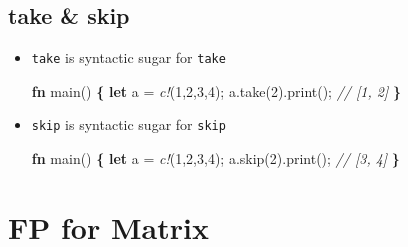 \documentclass[]{book}
\newenvironment{Shaded}{\begin{snugshade}}{\end{snugshade}}
\newcommand{\CommentTok}[1]{\textcolor[rgb]{0.56,0.35,0.01}{\textit{#1}}}
\newcommand{\DecValTok}[1]{\textcolor[rgb]{0.00,0.00,0.81}{#1}}
\newcommand{\KeywordTok}[1]{\textcolor[rgb]{0.13,0.29,0.53}{\textbf{#1}}}
\newcommand{\NormalTok}[1]{#1}
\newcommand{\OperatorTok}[1]{\textcolor[rgb]{0.81,0.36,0.00}{\textbf{#1}}}
\newcommand{\PreprocessorTok}[1]{\textcolor[rgb]{0.56,0.35,0.01}{\textit{#1}}}
\begin{document}
\hypertarget{take-skip}{%
\subsection{take \& skip}\label{take-skip}}

\begin{itemize}
\item
  \texttt{take} is syntactic sugar for \texttt{take}

\begin{Shaded}
\begin{Highlighting}[]
\KeywordTok{fn}\NormalTok{ main() }\OperatorTok{\{}
    \KeywordTok{let}\NormalTok{ a = }\PreprocessorTok{c!}\NormalTok{(}\DecValTok{1}\NormalTok{,}\DecValTok{2}\NormalTok{,}\DecValTok{3}\NormalTok{,}\DecValTok{4}\NormalTok{);}
\NormalTok{    a.take(}\DecValTok{2}\NormalTok{).print();}
    \CommentTok{// [1, 2]}
\OperatorTok{\}}
\end{Highlighting}
\end{Shaded}
\item
  \texttt{skip} is syntactic sugar for \texttt{skip}

\begin{Shaded}
\begin{Highlighting}[]
\KeywordTok{fn}\NormalTok{ main() }\OperatorTok{\{}
    \KeywordTok{let}\NormalTok{ a = }\PreprocessorTok{c!}\NormalTok{(}\DecValTok{1}\NormalTok{,}\DecValTok{2}\NormalTok{,}\DecValTok{3}\NormalTok{,}\DecValTok{4}\NormalTok{);}
\NormalTok{    a.skip(}\DecValTok{2}\NormalTok{).print();}
    \CommentTok{// [3, 4]}
\OperatorTok{\}}
\end{Highlighting}
\end{Shaded}
\end{itemize}

\hypertarget{fp-for-matrix}{%
\section{FP for Matrix}\label{fp-for-matrix}}
\end{document}
